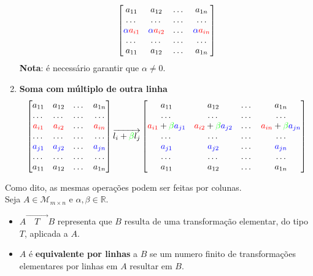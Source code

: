 \documentclass[]{report}
\begin{document}
\begin{enumerate}
$$\begin{bmatrix}
a_{11} & a_{12} & \dots & a_{1n}\\
\dots & \dots & \dots & \dots\\
\color{blue}\alpha\color{red}a_{i1} & \color{blue}\alpha\color{red}a_{i2} & \dots & \color{blue}\alpha\color{red}a_{in}\\
\dots & \dots & \dots & \dots\\
a_{11} & a_{12} & \dots & a_{1n}\\
\end{bmatrix}
$$
\textbf{Nota}: é necessário garantir que $\alpha \neq 0$.
\item \textbf{Soma com múltiplo de outra linha}
$$
\begin{bmatrix}
a_{11} & a_{12} & \dots & a_{1n}\\
\dots & \dots & \dots & \dots\\
\color{red}a_{i1} & \color{red}a_{i2} & \dots & \color{red}a_{in}\\
\dots & \dots & \dots & \dots\\
\color{blue}a_{j1} & \color{blue}a_{j2} & \dots & \color{blue}a_{jn}\\
\dots & \dots & \dots & \dots\\
a_{11} & a_{12} & \dots & a_{1n}\\
\end{bmatrix}
\overrightarrow{l_i + \textcolor{green}{\beta} l_j}
\begin{bmatrix}
a_{11} & a_{12} & \dots & a_{1n}\\
\dots & \dots & \dots & \dots\\
\textcolor{red}{a_{i1}}+ \color{green}\beta\color{blue}a_{j1} & \textcolor{red}{a_{i2}}+ \color{green}\beta\color{blue}a_{j2} & \dots & \textcolor{red}{a_{in}}+ \color{green}\beta\color{blue}a_{jn}\\
\dots & \dots & \dots & \dots\\
\color{blue}a_{j1} & \color{blue}a_{j2} & \dots & \color{blue}a_{jn}\\
\dots & \dots & \dots & \dots\\
a_{11} & a_{12} & \dots & a_{1n}\\
\end{bmatrix}
$$
\end{enumerate}
Como dito, as mesmas operações podem ser feitas por colunas.\\[0.5cm]
Seja $A \in \mathcal{M}_{m \times n}$ e $\alpha, \beta \in \mathbb{R}$.
\begin{itemize}
\item $A {\scriptstyle{\overrightarrow{\quad T \quad}}} B$ representa que $B$ resulta de uma transformação elementar, do tipo $T$, aplicada a $A$.
\item $A$ é \textbf{equivalente por linhas} a $B$ se um numero finito de transformações elementares por linhas em $A$ resultar em $B$.
\end{itemize}
\end{document}
